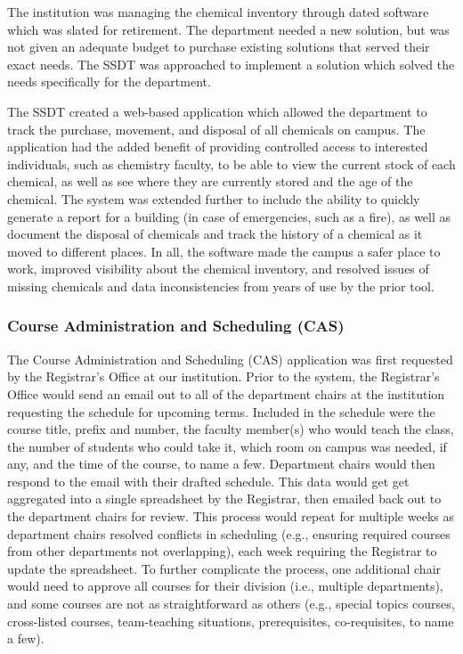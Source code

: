 The institution was managing the chemical inventory through dated software which was slated for retirement. The department needed a new solution, but was not given an adequate budget to purchase existing solutions that served their exact needs. The SSDT was approached to implement a solution which solved the needs specifically for the department. 

The SSDT created a web-based application which allowed the department to track the purchase, movement, and disposal of all chemicals on campus. The application had the added benefit of providing controlled access to interested individuals, such as chemistry faculty, to be able to view the current stock of each chemical, as well as see where they are currently stored and the age of the chemical. The system was extended further to include the ability to quickly generate a report for a building (in case of emergencies, such as a fire), as well as document the disposal of chemicals and track the history of a chemical as it moved to different places. In all, the software made the campus a safer place to work, improved visibility about the chemical inventory, and resolved issues of missing chemicals and data inconsistencies from years of use by the prior tool.

\subsubsection{Course Administration and Scheduling (CAS)}
The Course Administration and Scheduling (CAS) application was first requested by the Registrar's Office at our institution. Prior to the system, the Registrar's Office would send an email out to all of the department chairs at the institution requesting the schedule for upcoming terms. Included in the schedule were the course title, prefix and number, the faculty member(s) who would teach the class, the number of students who could take it, which room on campus was needed, if any, and the time of the course, to name a few. Department chairs would then respond to the email with their drafted schedule. This data would get get aggregated into a single spreadsheet by the Registrar, then emailed back out to the department chairs for review. This process would repeat for multiple weeks as department chairs resolved conflicts in scheduling (e.g., ensuring required courses from other departments not overlapping), each week requiring the Registrar to update the spreadsheet. To further complicate the process, one additional chair would need to approve all courses for their division (i.e., multiple departments), and some courses are not as straightforward as others (e.g., special topics courses, cross-listed courses, team-teaching situations, prerequisites, co-requisites, to name a few). 

